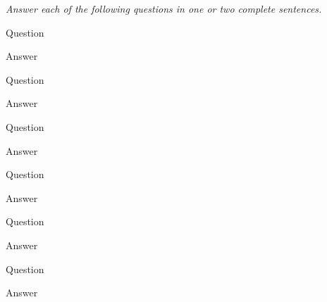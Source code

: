 \documentclass[%
addpoints]{exam}
\begin{document}
 
	\begin{center}
	\parbox{5.5in}{\centering\itshape Answer each of the following questions in one or two complete sentences.}
	\end{center}
 
	\begin{questions}
 
	\question[2]
		Question
 
		\begin{solution}[\stretch{1}]
			Answer
		\end{solution}
 
	\question[2]
		Question
 
		\begin{solution}[\stretch{1}]
			Answer
		\end{solution}
 
	\question[2]
		Question
 
		\begin{solution}[\stretch{1}]
			Answer
		\end{solution}
 
	\question[2]
		Question
 
		\begin{solution}[\stretch{1}]
			Answer
		\end{solution}
 
	\question[2]
		Question
 
		\begin{solution}[\stretch{1}]
			Answer
		\end{solution}
 
	\bonusquestion[2]
		Question
 
		\begin{solution}[\stretch{1}]
			Answer
		\end{solution}
 
	\newpage
	\end{questions}
\end{document}

